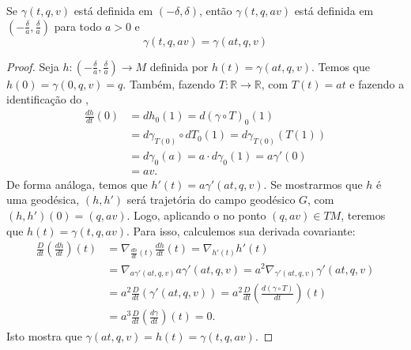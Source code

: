 \begin{lemma}
    \label{lem:homogeneidade-geodesicas}
    Se $\gamma(t,q,v)$ está definida em $(-\delta,\delta)$, então $\gamma(t,q,av)$ está definida em $\left( -\frac{\delta}{a},\frac{\delta}{a} \right)$ para todo $a >0$ e
    \begin{equation*}
        \gamma(t, q, av)=\gamma(at,q,v)
    \end{equation*}
    \begin{proof}

        Seja $h:\left( -\frac{\delta}{a},\frac{\delta}{a} \right)\to M$ definida por $h(t)=\gamma(at,q,v)$. Temos que $h(0)=\gamma(0,q,v)=q$. Também, fazendo $T:\mathbb{R}\to \mathbb{R}$, com $T(t)=at$ e fazendo a identificação do ,
        \begin{align*}
            \frac{dh}{dt}(0) & =dh_{0}(1) =d(\gamma \circ  T)_{0}(1)                       \\
                             & =d\gamma_{T(0)} \circ  dT_{0}(1) =d\gamma_{T(0)}(T(1))      \\
                             & =d\gamma_{0}(a) = a \cdot d\gamma_{0}(1)     = a \gamma'(0) \\
                             & =av.
        \end{align*}
        De forma análoga, temos que $h'(t)=a\gamma'(at,q,v)$.
        Se mostrarmos que $h$ é uma geodésica, $(h, h')$ será trajetória do campo geodésico $G$, com $(h,h')(0)=(q,av)$. Logo, aplicando o  no ponto $(q,av) \in TM$, teremos que $h(t)=\gamma(t,q,av)$. Para isso, calculemos sua derivada covariante:
        \begin{align*}
            \frac{D}{dt}\left( \frac{dh}{dt} \right)(t) & =\nabla_{\frac{dh}{dt}(t)}\frac{dh}{dt}(t) = \nabla_{h'(t)}h'(t)                                       \\
                                                        & = \nabla_{a\gamma'(at,q,v)}a\gamma'(at,q,v) = a^{2}\nabla_{\gamma'(at,q,v)}\gamma'(at,q,v)             \\
                                                        & = a^{2}\frac{D}{dt}(\gamma'(at,q,v)) = a^{2}\frac{D}{dt}\left( \frac{d(\gamma \circ T)}{dt} \right)(t) \\
                                                        & = a^{3} \frac{D}{dt}\left( \frac{d\gamma}{dt} \right)(t) = 0.
        \end{align*}
        Isto mostra que $\gamma(at,q,v)=h(t)=\gamma(t,q,av)$.
    \end{proof}
\end{lemma}
